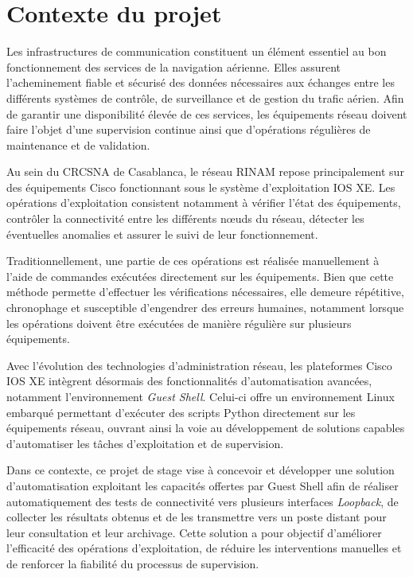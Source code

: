 \documentclass[12pt, a4paper, oneside]{report}
\begin{document}
\section{Contexte du projet}

Les infrastructures de communication constituent un élément essentiel au bon fonctionnement 
des services de la navigation aérienne. Elles assurent l'acheminement fiable et sécurisé des 
données nécessaires aux échanges entre les différents systèmes de contrôle, de surveillance 
et de gestion du trafic aérien. Afin de garantir une disponibilité élevée de ces services, 
les équipements réseau doivent faire l'objet d'une supervision continue ainsi que d'opérations 
régulières de maintenance et de validation.

Au sein du \ac{CRCSNA} de Casablanca, le réseau \ac{RINAM} repose principalement sur des équipements
Cisco fonctionnant sous le système d'exploitation \ac{IOS XE}. Les opérations d'exploitation consistent 
notamment à vérifier l'état des équipements, contrôler la connectivité entre les différents nœuds du réseau, 
détecter les éventuelles anomalies et assurer le suivi de leur fonctionnement.

Traditionnellement, une partie de ces opérations est réalisée manuellement à l'aide de commandes 
exécutées directement sur les équipements. Bien que cette méthode permette d'effectuer les 
vérifications nécessaires, elle demeure répétitive, chronophage et susceptible d'engendrer 
des erreurs humaines, notamment lorsque les opérations doivent être exécutées de manière régulière 
sur plusieurs équipements.

Avec l'évolution des technologies d'administration réseau, les plateformes Cisco IOS XE intègrent 
désormais des fonctionnalités d'automatisation avancées, notamment l'environnement \textit{Guest Shell}. 
Celui-ci offre un environnement Linux embarqué permettant d'exécuter des scripts Python directement 
sur les équipements réseau, ouvrant ainsi la voie au développement de solutions capables d'automatiser 
les tâches d'exploitation et de supervision.

Dans ce contexte, ce projet de stage vise à concevoir et développer une solution d'automatisation 
exploitant les capacités offertes par Guest Shell afin de réaliser automatiquement des tests de 
connectivité vers plusieurs interfaces \textit{Loopback}, de collecter les résultats obtenus et 
de les transmettre vers un poste distant pour leur consultation et leur archivage. Cette solution 
a pour objectif d'améliorer l'efficacité des opérations d'exploitation, de réduire les interventions 
manuelles et de renforcer la fiabilité du processus de supervision.
\end{document}
